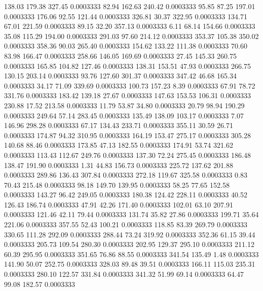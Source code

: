  138.03  179.38  327.45   0.0003333
  82.94  162.63  240.42   0.0003333
  95.85   87.25  197.01   0.0003333
 176.06   92.55  121.44   0.0003333
 326.81   30.37  322.95   0.0003333
 134.71   67.01  221.59   0.0003333
  89.15   32.20  357.13   0.0003333
   6.11   68.14  154.66   0.0003333
  35.08  115.29  194.00   0.0003333
 291.03   97.60  214.12   0.0003333
 353.37  105.38  350.02   0.0003333
 358.36   90.03  265.40   0.0003333
 154.62  133.22  111.38   0.0003333
  70.60   83.98  166.47   0.0003333
 258.66  146.05  169.69   0.0003333
  27.45  145.33  260.75   0.0003333
 165.85  104.82  127.46   0.0003333
 138.31  153.51   47.93   0.0003333
 266.75  130.15  203.14   0.0003333
  93.76  127.60  301.37   0.0003333
 347.42   46.68  165.34   0.0003333
  34.17   71.09  339.69   0.0003333
 100.73  157.23    8.39   0.0003333
  67.91   78.72  331.76   0.0003333
 183.42  139.18   27.67   0.0003333
 147.63  153.53  106.31   0.0003333
 230.88   17.52  213.58   0.0003333
  11.79   53.87   34.80   0.0003333
  20.79   98.94  190.29   0.0003333
 249.64   57.14  283.45   0.0003333
 135.49  138.09  103.17   0.0003333
   7.07  146.96  298.28   0.0003333
  67.17  134.43  233.71   0.0003333
 355.11   30.59   26.71   0.0003333
 174.87   94.32  310.95   0.0003333
 164.19  153.47  275.17   0.0003333
 305.28  140.68   88.46   0.0003333
 173.85   47.13  182.55   0.0003333
 174.91   53.74  321.62   0.0003333
 113.43  112.67  249.76   0.0003333
 137.30   72.24  275.45   0.0003333
 186.48  138.47  191.90   0.0003333
   1.31   44.83  156.73   0.0003333
 225.72  137.62  201.88   0.0003333
 289.86  136.43  307.84   0.0003333
 272.18  119.67  325.58   0.0003333
   0.83   70.43  215.48   0.0003333
  98.18  149.70  139.95   0.0003333
  58.25   77.65  152.58   0.0003333
 143.27   96.42  249.05   0.0003333
 180.38  124.42  228.11   0.0003333
  40.52  126.43  186.74   0.0003333
  47.91   42.26  171.40   0.0003333
 102.01   63.10  207.91   0.0003333
 121.46   42.11   79.44   0.0003333
 131.74   35.82   27.86   0.0003333
 199.71   35.64  221.06   0.0003333
 357.55   52.43  100.21   0.0003333
 118.85   83.39  269.79   0.0003333
 330.65  111.28  292.09   0.0003333
 288.44   73.24  319.92   0.0003333
 352.36   61.15   39.44   0.0003333
 205.73  109.54  280.30   0.0003333
 202.95  129.37  295.10   0.0003333
 211.12   60.39  295.95   0.0003333
 351.65   76.86   88.55   0.0003333
 341.54  135.49    1.48   0.0003333
 141.90   50.07  252.75   0.0003333
 328.03   89.48   39.51   0.0003333
 166.11  115.03  235.31   0.0003333
 280.10  122.57  331.84   0.0003333
 341.32   51.99   69.14   0.0003333
  64.47   99.08  182.57   0.0003333
